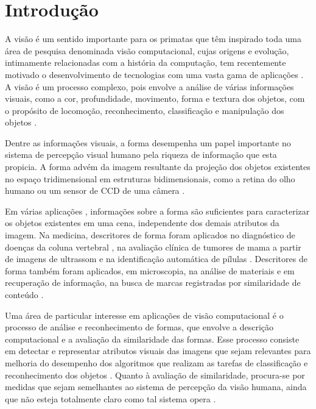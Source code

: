 
\chapter{Introdução \label{chap:INTRO}}


A visão é um sentido importante para os primatas que têm inspirado toda uma área de pesquisa denominada visão computacional, cujas origens e evolução, intimamente relacionadas com a história da computação, tem recentemente motivado o desenvolvimento de tecnologias com uma vasta gama de aplicações \cite{Costa:2009}. A visão é um processo complexo, pois envolve a análise de várias informações visuais, como a cor, profundidade, movimento, forma e textura dos objetos, com o propósito de locomoção, reconhecimento, classificação e manipulação dos objetos \cite{Ullman:1996}.

Dentre as informações visuais, a forma desempenha um papel importante no sistema de percepção visual humano pela riqueza de informação que esta propicia. A forma advém da imagem resultante da projeção dos objetos existentes no espaço tridimensional em estruturas bidimensionais, como a retina do olho humano ou um sensor de \acf{CCD}  de uma câmera \cite{Costa:2009}.

Em várias aplicações \cite{Zhang201661,Zhao20153203}, informações sobre a forma são suficientes para caracterizar os objetos existentes em uma cena, independente dos demais atributos da imagem. Na medicina, descritores de forma foram aplicados no diagnóstico de doenças da coluna vertebral \cite{Lee:2009}, na avaliação clínica de tumores de mama a partir de imagens de ultrassom \cite{Yang:2009} e na identificação automática de pílulas \cite{Ushizima:2015}.  Descritores de forma também foram aplicados, em microscopia, na análise de materiais \cite{Zhang201661} e em recuperação de informação, na busca de marcas registradas por similaridade de conteúdo \cite{MohdAnuar2013105,Qi20102017}.

Uma área de particular interesse em aplicações de visão computacional é o processo de análise e reconhecimento de formas, que envolve a descrição computacional e a avaliação da similaridade das formas. Esse processo consiste em detectar e representar atributos visuais das imagens que sejam relevantes para melhoria do desempenho dos algoritmos que realizam as tarefas de classificação e reconhecimento dos objetos \cite{Escolano:2009}. Quanto à avaliação de similaridade, procura-se por medidas que sejam semelhantes ao sistema de percepção da visão humana, ainda que não esteja totalmente claro como tal sistema opera \cite{4815272}. 

